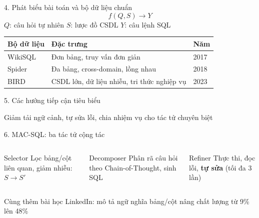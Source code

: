\documentclass[aspectratio=169,10pt]{beamer}
\begin{document}
\begin{frame}{4. Phát biểu bài toán và bộ dữ liệu chuẩn}
\[
f(Q, S) \rightarrow Y
\]
{\small $Q$: câu hỏi tự nhiên \quad $S$: lược đồ CSDL \quad $Y$: câu lệnh SQL}
\vspace{0.5cm}
\begin{center}
\begin{tabular}{lll}
\toprule
\textbf{Bộ dữ liệu} & \textbf{Đặc trưng} & \textbf{Năm} \\
\midrule
WikiSQL & Đơn bảng, truy vấn đơn giản & 2017 \\
Spider & Đa bảng, cross-domain, lồng nhau & 2018 \\
BIRD & CSDL lớn, dữ liệu nhiễu, tri thức nghiệp vụ & 2023 \\
\bottomrule
\end{tabular}
\end{center}
\end{frame}

\begin{frame}{5. Các hướng tiếp cận tiêu biểu}
\centering
{}
\vspace{0.4cm}

{\small Giảm tải ngữ cảnh, tự sửa lỗi, chia nhiệm vụ cho tác tử chuyên biệt}
\end{frame}

\begin{frame}{6. MAC-SQL: ba tác tử cộng tác}
\begin{columns}[T]
\begin{block}{Selector}
Lọc bảng/cột liên quan, giảm nhiễu: $S \to S'$
\end{block}
\begin{block}{Decomposer}
Phân rã câu hỏi theo Chain-of-Thought, sinh SQL
\end{block}
\begin{block}{Refiner}
Thực thi, đọc lỗi, \textbf{tự sửa} (tối đa 3 lần)
\end{block}
\end{columns}
\vspace{0.4cm}
\centering
\small Cùng thêm bài học LinkedIn: \alert{mô tả ngữ nghĩa bảng/cột} nâng chất lượng từ 9\% lên 48\%
\end{frame}
\end{document}
